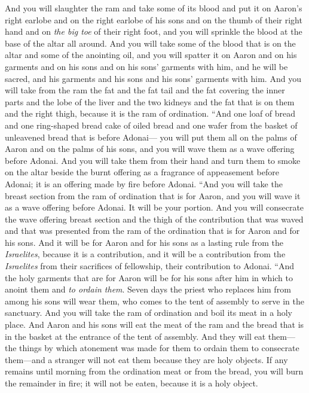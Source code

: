 \begin{biblechapter}
\verse And you will slaughter the ram and take some of its blood and put it on Aaron’s right earlobe and on the right earlobe of his sons and on the thumb of their right hand and on \textit{the big toe} of their right foot, and you will sprinkle the blood at the base of the altar all around.
\verse And you will take some of the blood that is on the altar and some of the anointing oil, and you will spatter it on Aaron and on his garments and on his sons and on his sons’ garments with him, and he will be sacred, and his garments and his sons and his sons’ garments with him.
\verse And you will take from the ram the fat and the fat tail and the fat covering the inner parts and the lobe of the liver and the two kidneys and the fat that is on them and the right thigh, because it is the ram of ordination.
\verse “And one loaf of bread and one ring-shaped bread cake of oiled bread and one wafer from the basket of unleavened bread that is before Adonai—
\verse you will put them all on the palms of Aaron and on the palms of his sons, and you will wave them as a wave offering before Adonai.
\verse And you will take them from their hand and turn them to smoke on the altar beside the burnt offering as a fragrance of appeasement before Adonai; it is an offering made by fire before Adonai.
\verse “And you will take the breast section from the ram of ordination that is for Aaron, and you will wave it as a wave offering before Adonai. It will be your portion.
\verse And you will consecrate the wave offering breast section and the thigh of the contribution that was waved and that was presented from the ram of the ordination that is for Aaron and for his sons.
\verse And it will be for Aaron and for his sons as a lasting rule from the \textit{Israelites}, because it is a contribution, and it will be a contribution from the \textit{Israelites} from their sacrifices of fellowship, their contribution to Adonai.
\verse “And the holy garments that are for Aaron will be for his sons after him in which to anoint them and \textit{to ordain them}.
\verse Seven days the priest who replaces him from among his sons will wear them, who comes to the tent of assembly to serve in the sanctuary.
\verse And you will take the ram of ordination and boil its meat in a holy place.
\verse And Aaron and his sons will eat the meat of the ram and the bread that is in the basket at the entrance of the tent of assembly.
\verse And they will eat them—the things by which atonement was made for them to ordain them to consecrate them—and a stranger will not eat them because they are holy objects.
\verse If any remains until morning from the ordination meat or from the bread, you will burn the remainder in fire; it will not be eaten, because it is a holy object.

\end{biblechapter}
